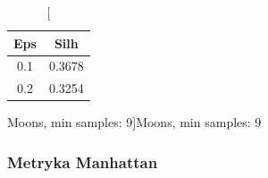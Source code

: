 \documentclass{classrep}
\begin{document}
{{{\begin{table}[!htbp]
\begin{minipage}{.24\textwidth}
                        \label{db_scan_table_Moons_eucl_min_sample8}
                    \end{minipage}
                    \hfill
                    \begin{minipage}{.24\textwidth}
                        \centering
                        \begin{tabular}{|c|c|}
                            \hline
                            Eps & Silh \\ \hline
                            0.1 & 0.3678 \\ \hline
                            0.2 & 0.3254 \\ \hline
                        \end{tabular}
                        \caption
                        [Moons, min samples: 9]{Moons, min samples: 9}
                        \label{db_scan_table_Moons_eucl_min_sample9}
                    \end{minipage}
                \end{table}
                \FloatBarrier

            }

            \subsubsection{Metryka Manhattan}
            \label{dbscan_manh} {

}}}
\end{document}
